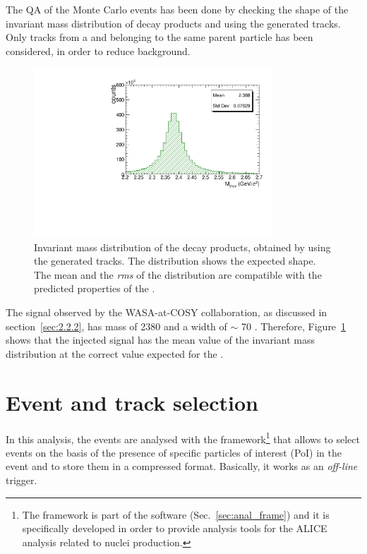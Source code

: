 The QA of the Monte Carlo events has been done by checking the shape of the invariant mass distribution
of \dst decay products and using the generated tracks. Only tracks from a \dst and belonging to the
same parent particle has been considered, in order to reduce background. 

\begin{figure}
    \centering
    \includegraphics[width=0.8\textwidth]{gfx/valid}
	\caption{Invariant mass distribution of the \dst decay products, obtained by using the generated tracks. The distribution shows the expected shape. The mean and the \textit{rms} of the distribution are compatible with the predicted properties of the \dst.}
	\label{fig:valid}
\end{figure}

The signal observed by the WASA-at-COSY collaboration, as discussed in section~\ref{sec:2.2.2}, has
mass of 2380 \mevcs and a width of $\sim$ 70 \mevcs. Therefore, Figure~\ref{fig:valid} shows that the
injected signal has the mean value of the invariant mass distribution at the correct value expected
for the \dst.

%
%
\section{Event and track selection} \label{sec:4.2}

In this analysis, the events are analysed with the  framework\footnote{The  
framework is part of the  software (Sec.~\ref{sec:anal_frame}) and it is 
specifically developed in order to provide analysis tools for the ALICE analysis related to nuclei
production.} that allows to select events on the basis of the presence of specific particles of 
interest (PoI) in the event and to store them in a compressed format. Basically, it works as an
\textit{off-line} trigger.


